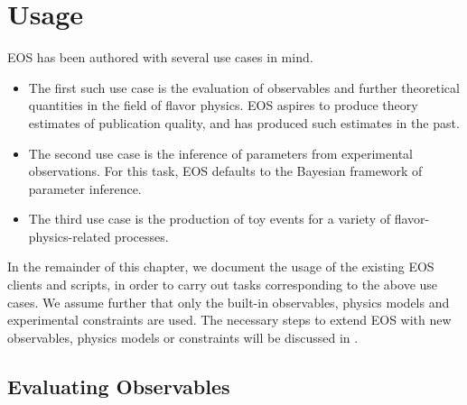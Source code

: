 
\chapter{Usage}
\label{ch:usage}

EOS has been authored with several use cases in mind.
\begin{itemize}
\item The first such use case is the evaluation of observables and further
theoretical quantities in the field of flavor physics. EOS aspires to produce
theory estimates of publication quality, and has produced such estimates in the
past.

\item The second use case is the inference of parameters from experimental
observations.  For this task, EOS defaults to the Bayesian framework of
parameter inference.

\item The third use case is the production of toy events for a variety of
flavor-physics-related processes.
\end{itemize}

In the remainder of this chapter, we document the usage of the existing EOS
clients and scripts, in order to carry out tasks corresponding to the above use
cases.  We assume further that only the built-in observables, physics models
and experimental constraints are used. The necessary steps to extend EOS with
new observables, physics models or constraints will be discussed in .

\section{Evaluating Observables}
\label{sec:usage:eos-evaluate}



